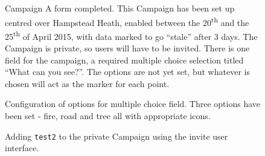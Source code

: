\documentclass{article}
\begin{document}
		\begin{figure}[H]
			\centering
			\caption{Campaign A form completed. This Campaign has been set up centred over Hampstead Heath, enabled between the 20\textsuperscript{th} and the 25\textsuperscript{th} of April 2015, with data marked to go ``stale'' after 3 days. The Campaign is private, so users will have to be invited. There is one field for the campaign, a required multiple choice selection titled ``What can you see?''. The options are not yet set, but whatever is chosen will act as the marker for each point.}
			\label{fig:eval-ca-3}
		\end{figure}

		\begin{figure}[H]
			\centering
			\caption{Configuration of options for multiple choice field. Three options have been set - fire, road and tree all with appropriate icons.}
			\label{fig:eval-ca-5}
		\end{figure}


		\begin{figure}[H]
			\centering
			\caption{Adding \texttt{test2} to the private Campaign using the invite user interface.}
			\label{fig:eval-ca-6}
		\end{figure}
\end{document}
